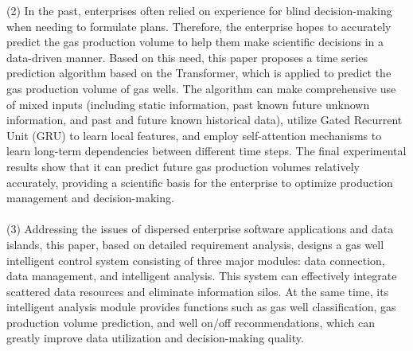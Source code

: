 \begin{englishabstract}
    (2) In the past, enterprises often relied on experience for blind decision-making when needing to formulate plans. Therefore, the enterprise hopes to accurately predict the gas production volume to help them make scientific decisions in a data-driven manner. Based on this need, this paper proposes a time series prediction algorithm based on the Transformer, which is applied to predict the gas production volume of gas wells. The algorithm can make comprehensive use of mixed inputs (including static information, past known future unknown information, and past and future known historical data), utilize Gated Recurrent Unit (GRU) to learn local features, and employ self-attention mechanisms to learn long-term dependencies between different time steps. The final experimental results show that it can predict future gas production volumes relatively accurately, providing a scientific basis for the enterprise to optimize production management and decision-making.
    \\~\\
    (3) Addressing the issues of dispersed enterprise software applications and data islands, this paper, based on detailed requirement analysis, designs a gas well intelligent control system consisting of three major modules: data connection, data management, and intelligent analysis. This system can effectively integrate scattered data resources and eliminate information silos. At the same time, its intelligent analysis module provides functions such as gas well classification, gas production volume prediction, and well on/off recommendations, which can greatly improve data utilization and decision-making quality.
    
    \vspace{0.5\baselineskip}
\end{englishabstract}
\XDUpremainmatter
